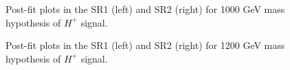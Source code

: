 \begin{figure}[H]
  \centering
  \caption{Post-fit plots in the SR1 (left) and SR2 (right) for 1000 GeV mass hypothesis of $H^{+}$ signal.}
  \label{fig:Postfit_Hp1000_Asimov}
\end{figure}
\begin{figure}[H]
  \centering
  \caption{Post-fit plots in the SR1 (left) and SR2 (right) for 1200 GeV mass hypothesis of $H^{+}$ signal.}
  \label{fig:Postfit_Hp1000_Asimov}
\end{figure}
